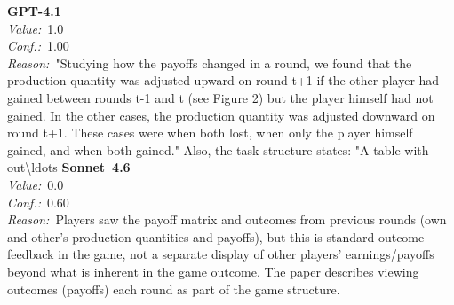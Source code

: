 \documentclass[11pt,a4paper]{article}
\begin{document}
\begin{tcolorbox}[
  title={\textbf{CONFIG\_showOtherSummaries} \textbar{} DOI: 10.1037\_npe0000069 \textbar{} Cond.~0},
  colback=blue!3!white,
  colframe=blue!45!black,
  fonttitle=\small\sffamily,
  sidebyside,
  sidebyside align=top seam,
  lower separated=false,
  breakable,
  before upper={\small},
  before lower={\small},
]
\textbf{GPT-4.1}\\[2pt]
\textit{Value:}~1.0\\[3pt]
\textit{Conf.:}~1.00\\[3pt]
\textit{Reason:}~"Studying how the payoffs changed in a round, we found that the production quantity was adjusted upward on round t+1 if the other player had gained between rounds t-1 and t (see Figure 2) but the player himself had not gained. In the other cases, the production quantity was adjusted downward on round t+1. These cases were when both lost, when only the player himself gained, and when both gained." Also, the task structure states: "A table with out\textbackslash{}ldots
\tcblower
\textbf{Sonnet~4.6}\\[2pt]
\textit{Value:}~0.0\\[3pt]
\textit{Conf.:}~0.60\\[3pt]
\textit{Reason:}~Players saw the payoff matrix and outcomes from previous rounds (own and other's production quantities and payoffs), but this is standard outcome feedback in the game, not a separate display of other players' earnings/payoffs beyond what is inherent in the game outcome. The paper describes viewing outcomes (payoffs) each round as part of the game structure.
\end{tcolorbox}
\end{document}
